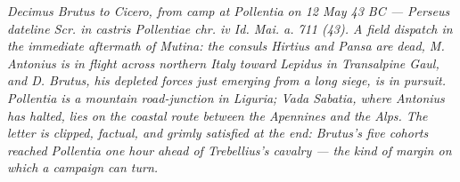 
\textit{Decimus Brutus to Cicero, from camp at Pollentia on 12 May 43 BC ---
Perseus dateline \textit{Scr. in castris Pollentiae chr. iv Id. Mai. a. 711
(43)}. A field dispatch in the immediate aftermath of Mutina: the consuls
Hirtius and Pansa are dead, M. Antonius is in flight across northern Italy
toward Lepidus in Transalpine Gaul, and D. Brutus, his depleted forces just
emerging from a long siege, is in pursuit. Pollentia is a mountain road-junction
in Liguria; Vada Sabatia, where Antonius has halted, lies on the coastal route
between the Apennines and the Alps. The letter is clipped, factual, and grimly
satisfied at the end: Brutus's five cohorts reached Pollentia one hour
ahead of Trebellius's cavalry --- the kind of margin on which a campaign can
turn.}
